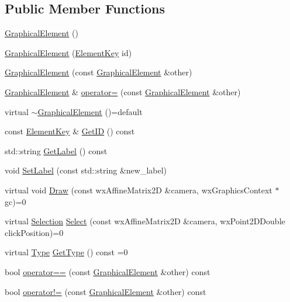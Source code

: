 \subsection*{Public Member Functions}
\begin{DoxyCompactItemize}
\item 
\hyperlink{class_graphical_element_a9f116ee2cd16dd099c2579864415d7b8}{Graphical\+Element} ()
\item 
\hyperlink{class_graphical_element_a1ff046ba61906c1c7caa49c09de58c9c}{Graphical\+Element} (\hyperlink{_graphical_element_8h_ade5fd6c85839a416577ff9de1605141e}{Element\+Key} id)
\item 
\hyperlink{class_graphical_element_a04282c63cee46ebc0f3f7c46fc871a40}{Graphical\+Element} (const \hyperlink{class_graphical_element}{Graphical\+Element} \&other)
\item 
\hyperlink{class_graphical_element}{Graphical\+Element} \& \hyperlink{class_graphical_element_add7f7f8fe319b3d966ffe3e756ef7b2e}{operator=} (const \hyperlink{class_graphical_element}{Graphical\+Element} \&other)
\item 
virtual \hyperlink{class_graphical_element_ad96eef4506d4680b10507ab563552b48}{$\sim$\+Graphical\+Element} ()=default
\item 
const \hyperlink{_graphical_element_8h_ade5fd6c85839a416577ff9de1605141e}{Element\+Key} \& \hyperlink{class_graphical_element_a09ed630bc819c852f96ed20dda8d84e8}{Get\+ID} () const
\item 
std\+::string \hyperlink{class_graphical_element_a82ab7426dc354b2a91bf0ccc0a34b0b3}{Get\+Label} () const
\item 
void \hyperlink{class_graphical_element_a43627056bafcd65a43eb424dff889e99}{Set\+Label} (const std\+::string \&new\+\_\+label)
\item 
virtual void \hyperlink{class_graphical_element_ab137d6d3ad82fd08b5610519dda0c600}{Draw} (const wx\+Affine\+Matrix2D \&camera, wx\+Graphics\+Context $\ast$gc)=0
\item 
virtual \hyperlink{struct_selection}{Selection} \hyperlink{class_graphical_element_a2627b34e57829f942aa00720d9cc8b46}{Select} (const wx\+Affine\+Matrix2D \&camera, wx\+Point2\+D\+Double click\+Position)=0
\item 
virtual \hyperlink{class_graphical_element_aa485be48b901d85de97b3bd86f381d9e}{Type} \hyperlink{class_graphical_element_a28c3cdbdfa3f295f6afaf463ba3e6157}{Get\+Type} () const =0
\item 
bool \hyperlink{class_graphical_element_a4bbe253b3e4455a4084de813cf2235a8}{operator==} (const \hyperlink{class_graphical_element}{Graphical\+Element} \&other) const
\item 
bool \hyperlink{class_graphical_element_a23d2d7494818f017ca0f0ea4f36f54b5}{operator!=} (const \hyperlink{class_graphical_element}{Graphical\+Element} \&other) const
\end{DoxyCompactItemize}
